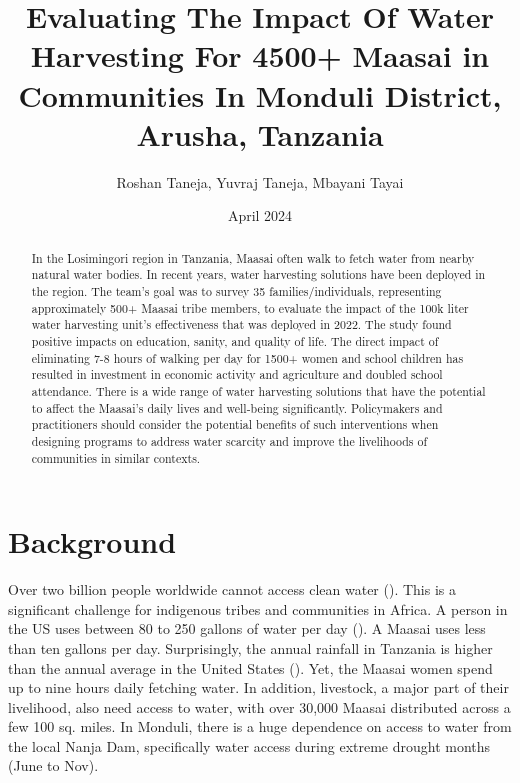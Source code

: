 \documentclass[10pt, twocolumn]{article}
\title{Evaluating The Impact Of Water Harvesting For 4500+ Maasai in Communities In Monduli District, Arusha, Tanzania}
\author{Roshan Taneja, Yuvraj Taneja, Mbayani Tayai}
\date{April 2024}
\begin{document}
\maketitle

\begin{abstract}
In the Losimingori region in Tanzania, Maasai often walk to fetch water from nearby natural water bodies. In recent years, water harvesting solutions have been deployed in the region. The team's goal was to survey 35 families/individuals, representing approximately 500+ Maasai tribe members, to evaluate the impact of the 100k liter water harvesting unit's effectiveness that was deployed in 2022. The study found positive impacts on education, sanity, and quality of life. The direct impact of eliminating 7-8 hours of walking per day for 1500+ women and school children has resulted in investment in economic activity and agriculture and doubled school attendance. There is a wide range of water harvesting solutions that have the potential to affect the Maasai's daily lives and well-being significantly. Policymakers and practitioners should consider the potential benefits of such interventions when designing programs to address water scarcity and improve the livelihoods of communities in similar contexts.
\end{abstract}





















\section{Background}

Over two billion people worldwide cannot access clean water (\autocite{UNICEF2023}). This is a significant challenge for indigenous tribes and communities in Africa. A person in the US uses between 80 to 250 gallons of water per day (\autocite{EPA}). A Maasai uses less than ten gallons per day. Surprisingly, the annual rainfall in Tanzania is higher than the annual average in the United States (\autocite{Monduli}). Yet, the Maasai women spend up to nine hours daily fetching water. In addition, livestock, a major part of their livelihood, also need access to water, with over 30,000 Maasai distributed across a few 100 sq. miles. In Monduli, there is a huge dependence on access to water from the local Nanja Dam, specifically water access during extreme drought months (June to Nov).
\end{document}
